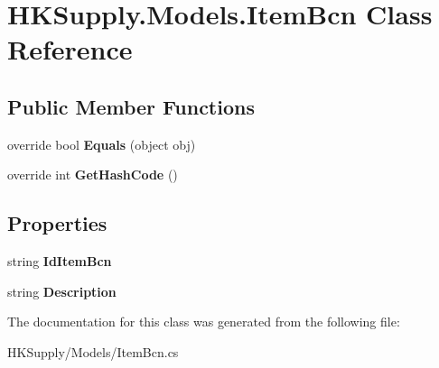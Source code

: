 \hypertarget{class_h_k_supply_1_1_models_1_1_item_bcn}{}\section{H\+K\+Supply.\+Models.\+Item\+Bcn Class Reference}
\label{class_h_k_supply_1_1_models_1_1_item_bcn}
\subsection*{Public Member Functions}
\begin{DoxyCompactItemize}
\item 
\mbox{\label{class_h_k_supply_1_1_models_1_1_item_bcn_a5d8ad845f4192525ae3fa58d927ebf17}} 
override bool {\bfseries Equals} (object obj)
\item 
\mbox{\label{class_h_k_supply_1_1_models_1_1_item_bcn_aa6a044fe0a79fa969404d235b84846da}} 
override int {\bfseries Get\+Hash\+Code} ()
\end{DoxyCompactItemize}
\subsection*{Properties}
\begin{DoxyCompactItemize}
\item 
\mbox{\label{class_h_k_supply_1_1_models_1_1_item_bcn_a16a297c0d57caf8a448a96332d96df63}} 
string {\bfseries Id\+Item\+Bcn}
\item 
\mbox{\label{class_h_k_supply_1_1_models_1_1_item_bcn_a45b15ea75ba5967bebb7ab19a3e6e63f}} 
string {\bfseries Description}
\end{DoxyCompactItemize}


The documentation for this class was generated from the following file\+:\begin{DoxyCompactItemize}
\item 
H\+K\+Supply/\+Models/Item\+Bcn.\+cs\end{DoxyCompactItemize}
